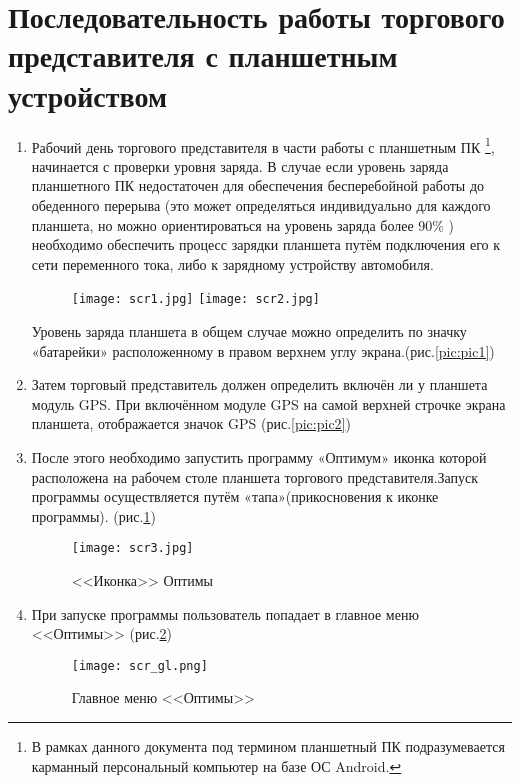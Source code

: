 \section{Последовательность работы торгового представителя с планшетным\\ устройством}
\begin{enumerate}[\thesection .1]
\item Рабочий день торгового представителя в части работы с планшетным ПК \footnote{В рамках данного документа под термином планшетный ПК подразумевается карманный персональный компьютер на базе ОС Android.}, начинается с проверки уровня заряда. В случае если уровень заряда планшетного ПК недостаточен для обеспечения бесперебойной работы до обеденного перерыва (это может определяться индивидуально для каждого планшета, но можно ориентироваться на уровень заряда более 90\% ) необходимо обеспечить процесс зарядки планшета путём подключения его к сети переменного тока, либо к зарядному устройству автомобиля.

\begin{figure}[h]
	\begin{floatrow}
		{\texttt{[image: scr1.jpg]}}
		{\texttt{[image: scr2.jpg]}}         
	\end{floatrow}
\end{figure}

Уровень заряда планшета в общем случае можно определить по значку «батарейки» расположенному в правом верхнем углу экрана.(рис.\ref{pic:pic1})
\item Затем торговый представитель должен определить включён ли у планшета модуль GPS.
При включённом модуле GPS  на самой верхней строчке экрана планшета, отображается значок GPS
(рис.\ref{pic:pic2})
\item После этого необходимо запустить программу «Оптимум» иконка которой расположена на рабочем столе планшета торгового представителя.Запуск программы осуществляется путём «тапа»(прикосновения к иконке программы).
(рис.\ref{pic:pic3})
\begin{figure}[h]
\texttt{[image: scr3.jpg]} 
\caption{<<Иконка>> Оптимы}\label{pic:pic3}
\end{figure}

\item При запуске программы пользователь попадает в главное меню <<Оптимы>>\label{it:it2_1}
(рис.\ref{pic:picgl})
\begin{figure}[h]
	\texttt{[image: scr\_gl.png]} 
	\caption{Главное меню <<Оптимы>>}\label{pic:picgl}
\end{figure}



\end{enumerate}
